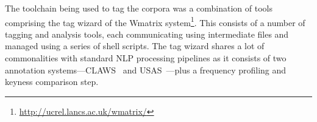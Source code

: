 The toolchain being used to tag the corpora was a combination of tools comprising the tag wizard of the Wmatrix system\footnote{\url{http://ucrel.lancs.ac.uk/wmatrix/}}.  
This consists of a number of tagging and analysis tools, each communicating using intermediate files and managed using a series of shell scripts.  
The tag wizard shares a lot of commonalities with standard NLP processing pipelines as it consists of two annotation systems---CLAWS~\cite{garside1997hybrid} and USAS~\cite{rayson2004ucrel}---plus a frequency profiling and keyness comparison step.
